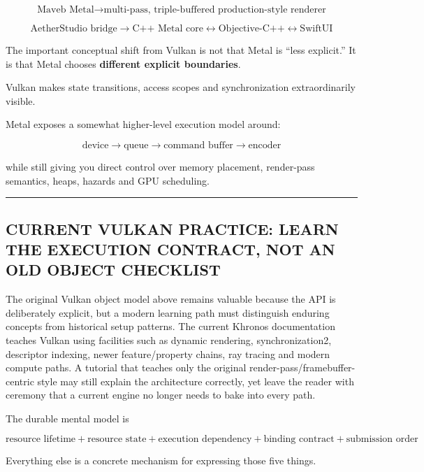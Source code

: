 \[
\boxed{
\text{Maveb Metal}
\rightarrow
\text{multi-pass, triple-buffered production-style renderer}
}
\]

\[
\boxed{
\text{AetherStudio bridge}
\rightarrow
\text{C++ Metal core}\leftrightarrow\text{Objective-C++}\leftrightarrow\text{SwiftUI}
}
\]

The important conceptual shift from Vulkan is not that Metal is ``less explicit.'' It is that Metal chooses \textbf{different explicit boundaries}.

Vulkan makes state transitions, access scopes and synchronization extraordinarily visible.

Metal exposes a somewhat higher-level execution model around:

\[
\text{device}
\rightarrow
\text{queue}
\rightarrow
\text{command buffer}
\rightarrow
\text{encoder}
\]

while still giving you direct control over memory placement, render-pass semantics, heaps, hazards and GPU scheduling.

\begin{center}\rule{0.5\linewidth}{0.5pt}\end{center}

\subsection{CURRENT VULKAN PRACTICE: LEARN THE EXECUTION CONTRACT, NOT AN OLD OBJECT CHECKLIST}\label{05-engine-i-ch023-current-vulkan-practice-learn-the-execution-contract-not-an-old-object-checklist}

The original Vulkan object model above remains valuable because the API is deliberately explicit, but a modern learning path must distinguish enduring concepts from historical setup patterns. The current Khronos documentation teaches Vulkan using facilities such as dynamic rendering, synchronization2, descriptor indexing, newer feature/property chains, ray tracing and modern compute paths. A tutorial that teaches only the original render-pass/framebuffer-centric style may still explain the architecture correctly, yet leave the reader with ceremony that a current engine no longer needs to bake into every path.

The durable mental model is

\[
\boxed{
\text{resource lifetime}
+
\text{resource state}
+
\text{execution dependency}
+
\text{binding contract}
+
\text{submission order}
}
\]

Everything else is a concrete mechanism for expressing those five things.

